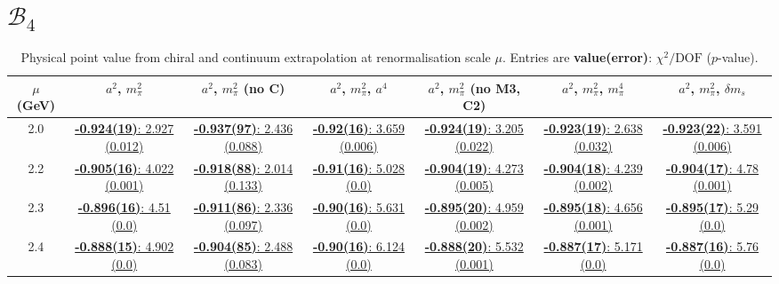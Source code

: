 \documentclass[12pt]{extarticle}
\begin{document}
\section{$\mathcal{B}_4$}
\begin{table}[h!]
\begin{center}
\begin{tabular}{|c|c|c|c|c|c|c|}
\hline
$\mu$ (GeV) & $a^2$, $m_\pi^2$& $a^2$, $m_\pi^2$ (no C)& $a^2$, $m_\pi^2$, $a^4$& $a^2$, $m_\pi^2$ (no M3, C2)& $a^2$, $m_\pi^2$, $m_\pi^4$& $a^2$, $m_\pi^2$, $\delta m_s$\\
\hline
2.0& \hyperlink{SSpPP/NPR/a2m2_20.pdf.1}{\textbf{-0.924(19)}: 2.927 (0.012)} & \hyperlink{SSpPP/NPR/a2m2noC_20.pdf.1}{\textbf{-0.937(97)}: 2.436 (0.088)} & \hyperlink{SSpPP/NPR/a2a4m2_20.pdf.1}{\textbf{-0.92(16)}: 3.659 (0.006)} & \hyperlink{SSpPP/NPR/a2m2mcut_20.pdf.1}{\textbf{-0.924(19)}: 3.205 (0.022)} & \hyperlink{SSpPP/NPR/a2m2m4_20.pdf.1}{\textbf{-0.923(19)}: 2.638 (0.032)} & \hyperlink{SSpPP/NPR/a2m2delm_20.pdf.1}{\textbf{-0.923(22)}: 3.591 (0.006)}\\
2.2& \hyperlink{SSpPP/NPR/a2m2_22.pdf.1}{\textbf{-0.905(16)}: 4.022 (0.001)} & \hyperlink{SSpPP/NPR/a2m2noC_22.pdf.1}{\textbf{-0.918(88)}: 2.014 (0.133)} & \hyperlink{SSpPP/NPR/a2a4m2_22.pdf.1}{\textbf{-0.91(16)}: 5.028 (0.0)} & \hyperlink{SSpPP/NPR/a2m2mcut_22.pdf.1}{\textbf{-0.904(19)}: 4.273 (0.005)} & \hyperlink{SSpPP/NPR/a2m2m4_22.pdf.1}{\textbf{-0.904(18)}: 4.239 (0.002)} & \hyperlink{SSpPP/NPR/a2m2delm_22.pdf.1}{\textbf{-0.904(17)}: 4.78 (0.001)}\\
2.3& \hyperlink{SSpPP/NPR/a2m2_23.pdf.1}{\textbf{-0.896(16)}: 4.51 (0.0)} & \hyperlink{SSpPP/NPR/a2m2noC_23.pdf.1}{\textbf{-0.911(86)}: 2.336 (0.097)} & \hyperlink{SSpPP/NPR/a2a4m2_23.pdf.1}{\textbf{-0.90(16)}: 5.631 (0.0)} & \hyperlink{SSpPP/NPR/a2m2mcut_23.pdf.1}{\textbf{-0.895(20)}: 4.959 (0.002)} & \hyperlink{SSpPP/NPR/a2m2m4_23.pdf.1}{\textbf{-0.895(18)}: 4.656 (0.001)} & \hyperlink{SSpPP/NPR/a2m2delm_23.pdf.1}{\textbf{-0.895(17)}: 5.29 (0.0)}\\
2.4& \hyperlink{SSpPP/NPR/a2m2_24.pdf.1}{\textbf{-0.888(15)}: 4.902 (0.0)} & \hyperlink{SSpPP/NPR/a2m2noC_24.pdf.1}{\textbf{-0.904(85)}: 2.488 (0.083)} & \hyperlink{SSpPP/NPR/a2a4m2_24.pdf.1}{\textbf{-0.90(16)}: 6.124 (0.0)} & \hyperlink{SSpPP/NPR/a2m2mcut_24.pdf.1}{\textbf{-0.888(20)}: 5.532 (0.001)} & \hyperlink{SSpPP/NPR/a2m2m4_24.pdf.1}{\textbf{-0.887(17)}: 5.171 (0.0)} & \hyperlink{SSpPP/NPR/a2m2delm_24.pdf.1}{\textbf{-0.887(16)}: 5.76 (0.0)}\\
\hline
\end{tabular}
\caption{Physical point value from chiral and continuum extrapolation at renormalisation scale $\mu$. Entries are \textbf{value(error)}: $\chi^2/\text{DOF}$ ($p$-value).}
\end{center}
\end{table}
\end{document}
